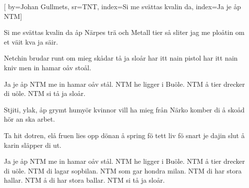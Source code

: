 

[ 		%
	by={Johan Gullmets},					%
	sr={TNT},					%
	index={Si me svättas kvalin da}, 						%
	index={Ja je åp NTM}]						%
	

\beginverse*						%
Si me svättas kvalin da
åp Närpes trä och Metall
tier så sliter jag me ploåtin
om et väit kva ja säir.

Netchin brudar runt om mieg
skådar tå ja sloår
har itt nain pistol
har itt nain kniv
men in hamar oåv stoål.
\endverse							%

\beginchorus
Ja je åp NTM
me in hamar oåv stål.
NTM
he ligger i Buöle.
NTM
å tier drecker di uöle.
NTM
si tå ja sloår.
\endchorus

\beginverse*						%
Stjiti, ylak, åp grymt humyör
kvinnor vill ha mieg
från Närko komber di å skoåd
hör an ska arbet.

Ta hit dotren, elå fruen
lies opp dönan å spring fö tett liv
fö snart je dajin slut
å karin släpper di ut.
\endverse							%

\beginchorus
Ja je åp NTM
me in hamar oåv stål.
NTM
he ligger i Buöle.
NTM
å tier drecker di uöle.
NTM
di lagar sopbilan.
NTM
som gar hondra milan.
NTM
di har stora hallar.
NTM
å di har stora ballar.
NTM
si tå ja sloår.
\endchorus

\endsong							%


